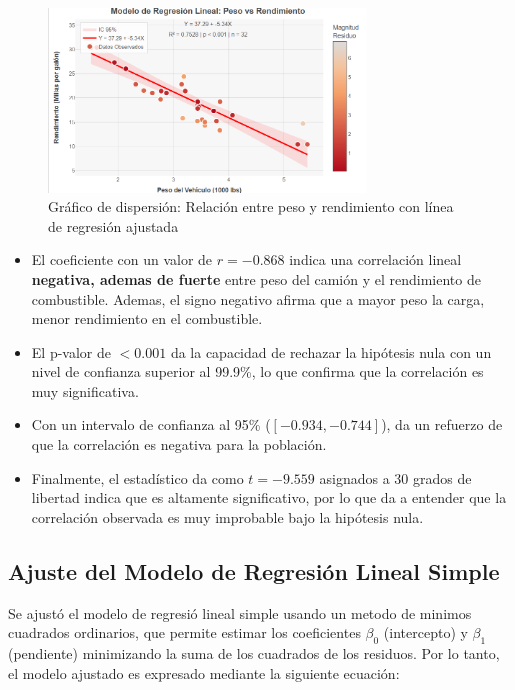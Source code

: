 \documentclass[12pt, letterpaper]{article}
\begin{document}
    \begin{figure}[H]
        \centering
        \includegraphics[width=0.75\textwidth]{Graficos/Grafico ajustado.png}
        \caption{Gráfico de dispersión: Relación entre peso y rendimiento con línea de regresión ajustada}
        \label{fig:dispersion}
    \end{figure}

    \begin{itemize}
        \item El coeficiente con un valor de $r = -0.868$ indica una correlación lineal
            \textbf{negativa, ademas de fuerte} entre peso del camión y el rendimiento de combustible. Ademas, el signo negativo
            afirma que a mayor peso la carga, menor rendimiento en el combustible.
        \item El p-valor de $< 0.001$ da la capacidad de rechazar la hipótesis nula con un nivel
            de confianza superior al 99.9\%, lo que confirma que la correlación es muy significativa.
        \item Con un intervalo de confianza al 95\% ($[-0.934, -0.744]$), da un refuerzo de que la correlación es negativa para la población.
        \item Finalmente, el estadístico da como $t = -9.559$ asignados a 30 grados de libertad indica que es altamente
            significativo, por lo que da a entender que la correlación observada es muy improbable
            bajo la hipótesis nula.
    \end{itemize}
    

    \subsection{Ajuste del Modelo de Regresión Lineal Simple}

    Se ajustó el modelo de regresió lineal simple usando un metodo de minimos cuadrados ordinarios, que permite estimar los coeficientes $\beta_0$ (intercepto) y $\beta_1$ (pendiente) minimizando la suma de los cuadrados de los residuos. Por lo tanto, el modelo ajustado es expresado mediante la siguiente ecuación:
\end{document}
